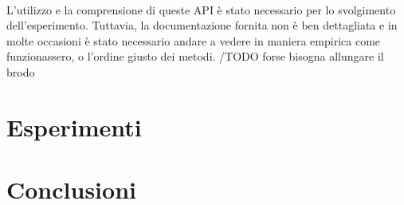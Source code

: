 \documentclass{llncs}
\begin{document}
\paragraph{} L'utilizzo e la comprensione di queste API è stato necessario per lo svolgimento dell'esperimento. Tuttavia, la documentazione fornita non è ben dettagliata e in molte occasioni è stato necessario andare a vedere in maniera empirica come funzionassero, o l'ordine giusto dei metodi.
/TODO forse bisogna allungare il brodo


\section{Esperimenti}

	
\section{Conclusioni}



\begin{thebibliography}{}
\end{thebibliography}
\end{document}
